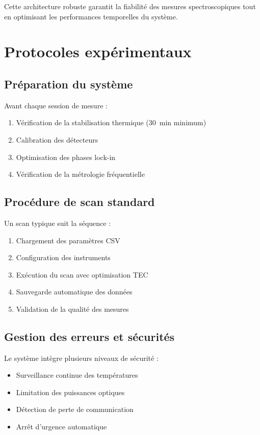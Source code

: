 Cette architecture robuste garantit la fiabilité des mesures spectroscopiques tout en optimisant les performances temporelles du système.





\section{Protocoles expérimentaux}

\subsection{Préparation du système}

Avant chaque session de mesure :
\begin{enumerate}
    \item Vérification de la stabilisation thermique (\SI{30}{\minute} minimum)
    \item Calibration des détecteurs
    \item Optimisation des phases lock-in
    \item Vérification de la métrologie fréquentielle
\end{enumerate}

\subsection{Procédure de scan standard}

Un scan typique suit la séquence :
\begin{enumerate}
    \item Chargement des paramètres CSV
    \item Configuration des instruments
    \item Exécution du scan avec optimisation TEC
    \item Sauvegarde automatique des données
    \item Validation de la qualité des mesures
\end{enumerate}

\subsection{Gestion des erreurs et sécurités}

Le système intègre plusieurs niveaux de sécurité :
\begin{itemize}
    \item Surveillance continue des températures
    \item Limitation des puissances optiques
    \item Détection de perte de communication
    \item Arrêt d'urgence automatique
\end{itemize}

